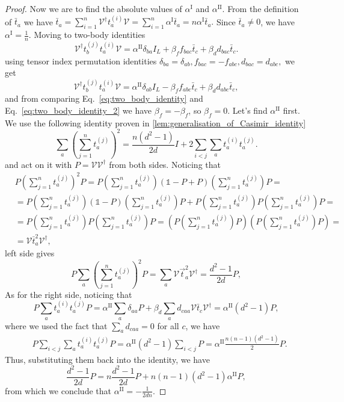 \documentclass[10pt,twocolumn,superscriptaddress,aps,amsmath,amssymb,citeautoscript,floatfix,prx]{revtex4-2}
\theoremstyle{plain}
\theoremstyle{plain}
\theoremstyle{plain}
\theoremstyle{plain}
\theoremstyle{plain}
\theoremstyle{plain}
\theoremstyle{plain}
\theoremstyle{definition}
\theoremstyle{plain}
\begin{document}
\begin{appendix}
\begin{proof}
Now we are to find the absolute values of $\alpha^{\text{I}}$ and $\alpha^{\text{II}}$. 
From the definition of $\bar{t}_a$ we have
$
\bar{t}_a=\sum_{i=1}^n \mathcal{V}^{\dagger} t_a^{(i)} \mathcal{V}=\sum_{i=1}^n \alpha^{\text{I}} \bar{t}_a=n \alpha^{\text{I}} \bar{t}_a.
$
Since $\bar{t}_a \neq 0$, we have $\alpha^{\text{I}}=\frac{1}{n}$.
Moving to two-body identities
\begin{equation}\label{eq:two_body_identity}
    \mathcal{V}^{\dagger} t_b^{(j)} t_a^{(i)} \mathcal{V}=\alpha^{\text{II}} \delta_{b a} I_L+\beta_{f} f_{b ac} \bar{t}_c +\beta_{d} d_{b ac} \bar{t}_c .
\end{equation}
using tensor index permutation identities
$
    \delta_{b a}=\delta_{a b}, f_{b ac}=-f_{a bc},  d_{b ac}=d_{a bc},
$
we get
\begin{equation}\label{eq:two_body_identity_2}
    \mathcal{V}^{\dagger} t_b^{(j)} t_a^{(i)} \mathcal{V}=\alpha^{\text{II}} \delta_{a b} I_L-\beta_{f} f_{a bc} \bar{t}_c +\beta_{d} d_{a bc} \bar{t}_c ,
\end{equation}
and  from comparing Eq.~\eqref{eq:two_body_identity} and Eq.~\eqref{eq:two_body_identity_2} we have $\beta_{f}=-\beta_{f}$, so $\beta_{f}=0$. Let's find $\alpha^{\text{II}}$ first.
We use the following identity proven in \ref{lem:generalisation_of_Casimir_identity}
\[
    \sum_a\left(\sum_{j=1}^n t^{(j)}_a\right)^2=\frac{n\left(d^2-1\right)}{2 d} I+2 \sum_{i<j} \sum_a t^{(i)}_a t^{(j)}_a.
\]
and act on it with $P=\mathcal{V} \mathcal{V}^{\dagger}$ from both sides. 
Noticing that
\begin{align}
    &P\left(\sum_{j=1}^n t^{(j)}_a\right)^2 P=P\left(\sum_{j=1}^n t^{(j)}_a\right)(\mathbb{1}-P+P)\left(\sum_{j=1}^n t^{(j)}_a\right)P=\\&=P\left(\sum_{j=1}^n t^{(j)}_a\right) 
    (\mathbb{1}-P)\left(\sum_{j=1}^n t^{(j)}_a\right)P+P\left(\sum_{j=1}^n t^{(j)}_a\right) P\left(\sum_{j=1}^n t^{(j)}_a\right)P=\\&=P\left(\sum_{j=1}^n t^{(j)}_a\right) 
    P\left(\sum_{j=1}^n t^{(j)}_a\right)P=\left(P\left(\sum_{j=1}^n t^{(j)}_a\right) P\right)\left(P\left(\sum_{j=1}^n t^{(j)}_a\right)P\right)=\\&=\mathcal{V}\bar{t}_a^2 \mathcal{V}^{\dagger},
\end{align}
left side gives
\[
    P \sum_a\left(\sum_{j=1}^n t^{(j)}_a\right)^2 P=\sum_a \mathcal{V}\vec{t}_a^2 \mathcal{V}^{\dagger} =\frac{d^2-1}{2 d} P,
\]
As for the right side, noticing that
\[
    P \sum_a t_a^{(i)} t_a^{(j)} P=\alpha^{\text{II}} \sum_a\delta_{a a} P+\beta_{d} \sum_a d_{c a a} \mathcal{V}\bar{t}_c \mathcal{V}^{\dagger}=\alpha^{\text{II}}(d^2-1) P,
\]
where we used the fact that $\sum_a d_{c a a}=0$ for all $c$, we have
\begin{align}
    &P \sum_{i<j} \sum_a t^{(i)}_a t^{(j)}_a P=\alpha^{\text{II}}(d^2-1) \sum_{i<j} P=\alpha^{\text{II}} \frac{n(n-1)(d^2-1)}{2} P.
\end{align}
Thus, substituting them back into the identity, we have
\[
    \frac{d^2-1}{2 d} P=n \frac{d^2-1}{2 d} P+n(n-1)\left(d^2-1\right) \alpha^{\text{II}} P,
\]
from which we conclude that $\alpha^{\text{II}}=-\frac{1}{2dn}$.


\end{proof}
\end{appendix}
\end{document}
